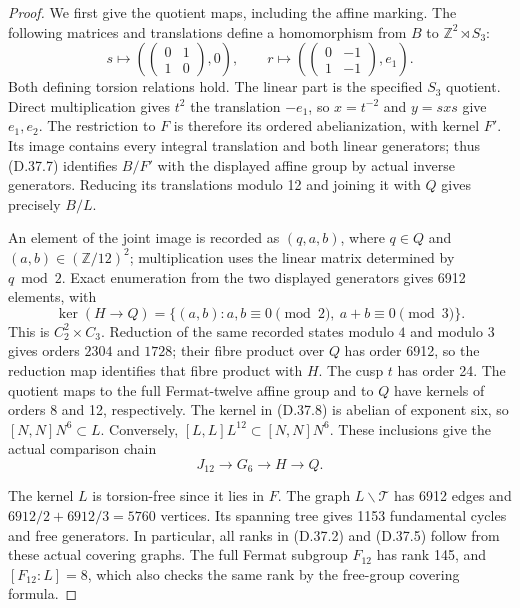 \begin{proof}
We first give the quotient maps, including the affine marking.
The following matrices and translations define a homomorphism
from $B$ to $\mathbb Z^2\rtimes S_3$:
\[
 s\longmapsto\left(
 \begin{pmatrix}0&1\\1&0\end{pmatrix},0\right),\qquad
 r\longmapsto\left(
 \begin{pmatrix}0&-1\\1&-1\end{pmatrix},e_1\right).
                                                               \tag{D.37.7}
\]
Both defining torsion relations hold. The linear part is the
specified $S_3$ quotient. Direct multiplication gives
$t^2$ the translation $-e_1$, so $x=t^{-2}$ and $y=sxs$
give $e_1,e_2$. The restriction to $F$ is therefore its
ordered abelianization, with kernel $F'$. Its image contains
every integral translation and both linear generators;
thus (D.37.7) identifies $B/F'$ with the displayed affine
group by actual inverse generators. Reducing its translations
modulo 12 and joining it with $Q$ gives precisely $B/L$.

An element of the joint image is recorded as $(q,a,b)$,
where $q\in Q$ and $(a,b)\in(\mathbb Z/12)^2$; multiplication
uses the linear matrix determined by $q\bmod2$.
Exact enumeration from the two displayed generators gives
6912 elements, with
\[
 \ker(H\to Q)=
 \{(a,b):a,b\equiv0\pmod2,\ a+b\equiv0\pmod3\}.
                                                               \tag{D.37.8}
\]
This is $C_2^2\times C_3$. Reduction of the same recorded
states modulo $4$ and modulo $3$ gives orders $2304$ and
$1728$; their fibre product over $Q$ has order 6912, so
the reduction map identifies that fibre product with $H$.
The cusp $t$ has order 24. The quotient maps to the full
Fermat-twelve affine group and to $Q$ have kernels of
orders 8 and 12, respectively.
The kernel in (D.37.8) is abelian of exponent six, so
$[N,N]N^6\subset L$. Conversely,
$[L,L]L^{12}\subset[N,N]N^6$. These inclusions give the
actual comparison chain
\[
 J_{12}\longrightarrow G_6\longrightarrow H\longrightarrow Q.
\]

The kernel $L$ is torsion-free since it lies in $F$.
The graph $L\backslash\mathcal T$ has 6912 edges and
$6912/2+6912/3=5760$ vertices. Its spanning tree gives
1153 fundamental cycles and free generators. In particular,
all ranks in (D.37.2) and (D.37.5) follow from these actual
covering graphs. The full Fermat subgroup $F_{12}$ has
rank 145, and $[F_{12}:L]=8$, which also checks the same
rank by the free-group covering formula.


\end{proof}
